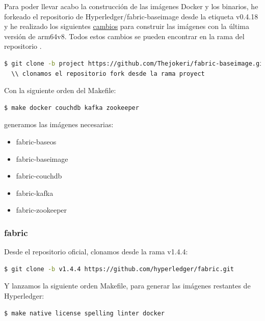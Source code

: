 Para poder llevar acabo la construcción de las imágenes Docker y los binarios, he forkeado el repositorio de 
Hyperledger/fabric-baseimage \cite{fabric-baseimage} desde la etiqueta v0.4.18 y he realizado los siguientes 
\href{https://github.com/Thejokeri/fabric-baseimage/commit/f3dfc7bcbdbd62c0c391aa3ce7eeb594ed6a3309}{cambios} para 
construir las imágenes con la última versión de arm64v8. Todos estos cambios se pueden encontrar en la rama  
del repositorio \cite{fork-fabric-baseimage}.

\begin{lstlisting}[language=bash]
  $ git clone -b project https://github.com/Thejokeri/fabric-baseimage.git 
  \\ clonamos el repositorio fork desde la rama proyect
\end{lstlisting}

\noindent Con la siguiente orden del Makefile:

\begin{lstlisting}[language=bash]
  $ make docker couchdb kafka zookeeper
\end{lstlisting}

\noindent generamos las imágenes necesarias:

\begin{itemize}
  \item fabric-baseos
  \item fabric-baseimage
  \item fabric-couchdb
  \item fabric-kafka
  \item fabric-zookeeper
\end{itemize}

\subsubsection*{fabric}

Desde el repositorio oficial, clonamos desde la rama v1.4.4:

\begin{lstlisting}[language=bash]
  $ git clone -b v1.4.4 https://github.com/hyperledger/fabric.git
\end{lstlisting}

\noindent Y lanzamos la siguiente orden Makefile, para generar las imágenes restantes de Hyperledger:

\begin{lstlisting}[language=bash]
  $ make native license spelling linter docker
\end{lstlisting}

